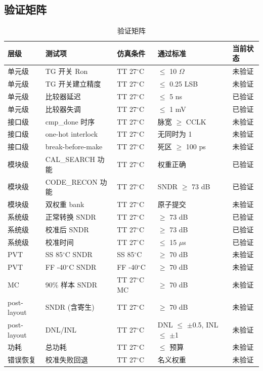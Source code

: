 \documentclass[UTF8,a4paper,11pt]{ctexart}
\providecommand{\textOmega}{\ensuremath{\Omega}}
\providecommand{\textmu}{\ensuremath{\mu}}
\begin{document}
\subsection{验证矩阵}

\begin{table}[H]
\centering
\caption{验证矩阵}
\label{tab:verify-matrix}
\small
\begin{tabular}{llp{2.5cm}p{2.5cm}p{1.5cm}}
\toprule
层级 & 测试项 & 仿真条件 & 通过标准 & 当前状态 \\
\midrule
单元级   & TG 开关 Ron          & TT 27$^\circ$C & $\leq$ 10 \textOmega        & 未验证 \\
单元级   & TG 开关建立精度      & TT 27$^\circ$C & $\leq$ 0.25 LSB             & 未验证 \\
单元级   & 比较器延迟           & TT 27$^\circ$C & $\leq$ 5 ns                 & 已验证 \\
单元级   & 比较器失调           & TT 27$^\circ$C & $\leq$ 1 mV                 & 已验证 \\
接口级   & cmp\_done 时序       & TT 27$^\circ$C & 脉宽 $\geq$ CCLK            & 未验证 \\
接口级   & one-hot interlock    & TT 27$^\circ$C & 无同时为 1                   & 未验证 \\
接口级   & break-before-make    & TT 27$^\circ$C & 死区 $\geq$ 100 ps          & 未验证 \\
模块级   & CAL\_SEARCH 功能     & TT 27$^\circ$C & 权重正确                     & 已验证 \\
模块级   & CODE\_RECON 功能     & TT 27$^\circ$C & SNDR $\geq$ 73 dB           & 已验证 \\
模块级   & 双权重 bank          & TT 27$^\circ$C & 原子提交                     & 未验证 \\
系统级   & 正常转换 SNDR        & TT 27$^\circ$C & $\geq$ 73 dB                & 已验证 \\
系统级   & 校准后 SNDR          & TT 27$^\circ$C & $\geq$ 73 dB                & 已验证 \\
系统级   & 校准时间             & TT 27$^\circ$C & $\leq$ 15 \textmu s         & 已验证 \\
PVT      & SS 85$^\circ$C SNDR  & SS 85$^\circ$C & $\geq$ 70 dB                & 未验证 \\
PVT      & FF -40$^\circ$C SNDR & FF -40$^\circ$C & $\geq$ 70 dB               & 未验证 \\
MC       & 90\% 样本 SNDR       & TT 27$^\circ$C MC & $\geq$ 70 dB             & 未验证 \\
post-layout & SNDR (含寄生)     & TT 27$^\circ$C & $\geq$ 70 dB                & 未验证 \\
post-layout & DNL/INL            & TT 27$^\circ$C & DNL $\leq$ $\pm$0.5, INL $\leq$ $\pm$1 & 未验证 \\
功耗     & 总功耗               & TT 27$^\circ$C & $\leq$ 预算                  & 未验证 \\
错误恢复 & 校准失败回退         & TT 27$^\circ$C & 名义权重                     & 未验证 \\
\bottomrule
\end{tabular}
\end{table}
\end{document}
